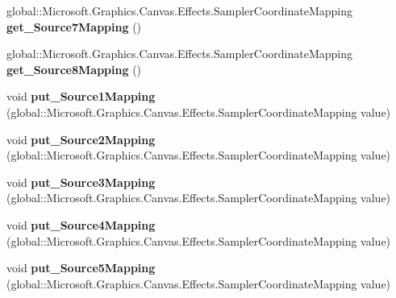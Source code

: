 \begin{DoxyCompactItemize}
global\+::\+Microsoft.\+Graphics.\+Canvas.\+Effects.\+Sampler\+Coordinate\+Mapping {\bfseries get\+\_\+\+Source7\+Mapping} ()
\item 
\mbox{\label{class_microsoft_1_1_graphics_1_1_canvas_1_1_effects_1_1_pixel_shader_effect_a5dcce5d430640e3d9c30f06eaf86ad51}} 
global\+::\+Microsoft.\+Graphics.\+Canvas.\+Effects.\+Sampler\+Coordinate\+Mapping {\bfseries get\+\_\+\+Source8\+Mapping} ()
\item 
\mbox{\label{class_microsoft_1_1_graphics_1_1_canvas_1_1_effects_1_1_pixel_shader_effect_a2e52d96845a79095f2d7cd88c6f0fc54}} 
void {\bfseries put\+\_\+\+Source1\+Mapping} (global\+::\+Microsoft.\+Graphics.\+Canvas.\+Effects.\+Sampler\+Coordinate\+Mapping value)
\item 
\mbox{\label{class_microsoft_1_1_graphics_1_1_canvas_1_1_effects_1_1_pixel_shader_effect_a95a6e6d9b141ff8c896341c054fd40f4}} 
void {\bfseries put\+\_\+\+Source2\+Mapping} (global\+::\+Microsoft.\+Graphics.\+Canvas.\+Effects.\+Sampler\+Coordinate\+Mapping value)
\item 
\mbox{\label{class_microsoft_1_1_graphics_1_1_canvas_1_1_effects_1_1_pixel_shader_effect_a32b3282c421972a1a9e968e98a81fad8}} 
void {\bfseries put\+\_\+\+Source3\+Mapping} (global\+::\+Microsoft.\+Graphics.\+Canvas.\+Effects.\+Sampler\+Coordinate\+Mapping value)
\item 
\mbox{\label{class_microsoft_1_1_graphics_1_1_canvas_1_1_effects_1_1_pixel_shader_effect_acc142d105918fc19997bdd131053a748}} 
void {\bfseries put\+\_\+\+Source4\+Mapping} (global\+::\+Microsoft.\+Graphics.\+Canvas.\+Effects.\+Sampler\+Coordinate\+Mapping value)
\item 
\mbox{\label{class_microsoft_1_1_graphics_1_1_canvas_1_1_effects_1_1_pixel_shader_effect_ab43818dee8ea5149c3ded368b51aac5f}} 
void {\bfseries put\+\_\+\+Source5\+Mapping} (global\+::\+Microsoft.\+Graphics.\+Canvas.\+Effects.\+Sampler\+Coordinate\+Mapping value)

\end{DoxyCompactItemize}

